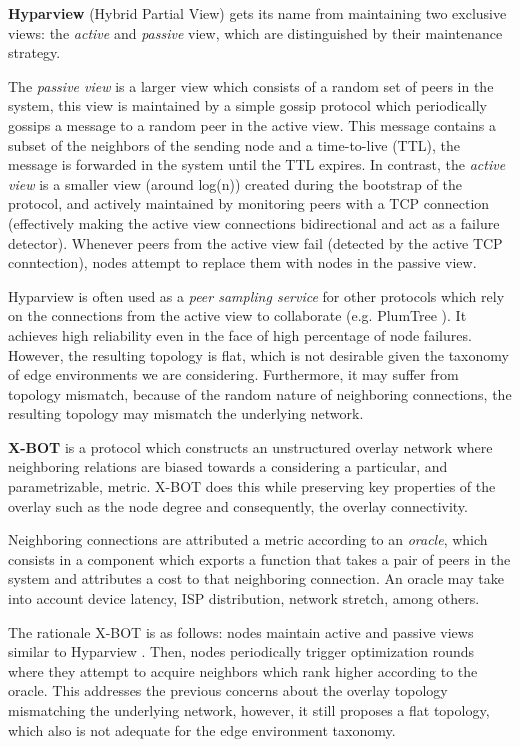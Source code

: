 \textbf{Hyparview} \cite{Hyparview} (Hybrid Partial View) gets its name from maintaining two exclusive views: the \textit{active} and \textit{passive} view, which are distinguished by their maintenance strategy. 

The \textit{passive view} is a larger view which consists of a random set of peers in the system, this view is maintained by a simple gossip protocol which periodically gossips a message to a random peer in the active view. This message contains a subset of the neighbors of the sending node and a time-to-live (TTL), the message is forwarded in the system until the TTL expires. In contrast, the \textit{active view} is a smaller view (around log(n)) created during the bootstrap of the protocol, and actively maintained by monitoring peers with a TCP connection (effectively making the active view connections bidirectional and act as a failure detector). Whenever peers from the active view fail (detected by the active TCP conntection), nodes attempt to replace them with nodes in the passive view.

Hyparview is often used as a \textit{peer sampling service} for other protocols which rely on the connections from the active view to collaborate (e.g. PlumTree \cite{leitao2007epidemic}). It achieves high reliability even in the face of high percentage of node failures. However, the resulting topology is flat, which is not desirable given the taxonomy of edge environments we are considering. Furthermore, it may suffer from topology mismatch, because of the random nature of neighboring connections, the resulting topology may mismatch the underlying network.

\textbf{X-BOT} \cite{leitao2012x} is a protocol which constructs an unstructured overlay network where neighboring relations are biased towards a considering a particular, and parametrizable, metric. X-BOT does this while preserving key properties of the overlay such as the node degree and consequently, the overlay connectivity.

Neighboring connections are attributed a metric according to an \textit{oracle}, which consists in a component which exports a function that takes a pair of peers in the system and attributes a cost to that neighboring connection. An oracle may take into account device latency, ISP distribution, network stretch, among others. 

The rationale X-BOT is as follows: nodes maintain active and passive views similar to Hyparview \cite{Hyparview}. Then, nodes periodically trigger optimization rounds where they attempt to acquire neighbors which rank higher according to the oracle. This addresses the previous concerns about the overlay topology mismatching the underlying network, however, it still proposes a flat topology, which also is not adequate for the edge environment taxonomy. 

